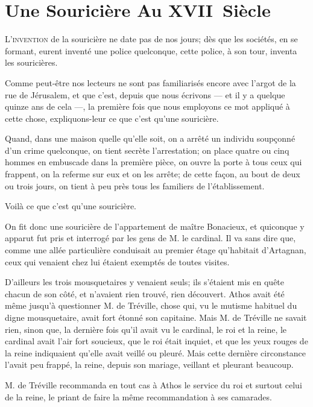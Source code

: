
\chapter{Une Souricière Au XVII\ieme\ Siècle} 
	
	\lettrine{L}{'invention} de la souricière ne date pas de nos jours; dès que les sociétés, en se formant, eurent inventé une police quelconque, cette police, à son tour, inventa les souricières. 

\zz
Comme peut-être nos lecteurs ne sont pas familiarisés encore avec l'argot de la rue de Jérusalem, et que c'est, depuis que nous écrivons --- et il y a quelque quinze ans de cela ---, la première fois que nous employons ce mot appliqué à cette chose, expliquons-leur ce que c'est qu'une souricière. 

Quand, dans une maison quelle qu'elle soit, on a arrêté un individu soupçonné d'un crime quelconque, on tient secrète l'arrestation; on place quatre ou cinq hommes en embuscade dans la première pièce, on ouvre la porte à tous ceux qui frappent, on la referme sur eux et on les arrête; de cette façon, au bout de deux ou trois jours, on tient à peu près tous les familiers de l'établissement. 

Voilà ce que c'est qu'une souricière. 

On fit donc une souricière de l'appartement de maître Bonacieux, et quiconque y apparut fut pris et interrogé par les gens de M. le cardinal. Il va sans dire que, comme une allée particulière conduisait au premier étage qu'habitait d'Artagnan, ceux qui venaient chez lui étaient exemptés de toutes visites. 

D'ailleurs les trois mousquetaires y venaient seuls; ils s'étaient mis en quête chacun de son côté, et n'avaient rien trouvé, rien découvert. Athos avait été même jusqu'à questionner M. de Tréville, chose qui, vu le mutisme habituel du digne mousquetaire, avait fort étonné son capitaine. Mais M. de Tréville ne savait rien, sinon que, la dernière fois qu'il avait vu le cardinal, le roi et la reine, le cardinal avait l'air fort soucieux, que le roi était inquiet, et que les yeux rouges de la reine indiquaient qu'elle avait veillé ou pleuré. Mais cette dernière circonstance l'avait peu frappé, la reine, depuis son mariage, veillant et pleurant beaucoup. 

M. de Tréville recommanda en tout cas à Athos le service du roi et surtout celui de la reine, le priant de faire la même recommandation à ses camarades. 

